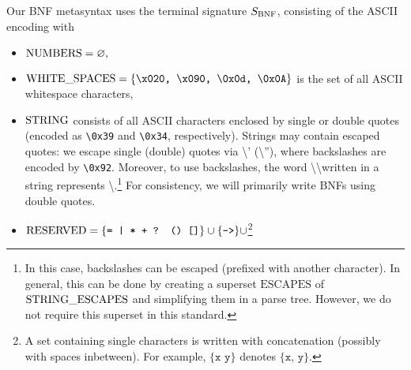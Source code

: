 


Our BNF metasyntax uses the terminal signature $S_{\mathrm{BNF}}$, consisting of the ASCII encoding with
\begin{itemize}
  \item $\mathrm{NUMBERS} = \varnothing,$
  \item $\mathrm{WHITE\_SPACES} = \{\texttt{\textbackslash x020, \textbackslash x090, \textbackslash 0x0d, \textbackslash 0x0A}\} $ is the set of all ASCII whitespace characters,
  \item $\mathrm{STRING}$ consists of all ASCII characters enclosed by single or double quotes (encoded as \texttt{\textbackslash 0x39} and \texttt{\textbackslash 0x34}, respectively). Strings may contain escaped quotes: we escape single (double) quotes via \textbackslash' (\textbackslash''), where backslashes are encoded by \texttt{\textbackslash 0x92}. Moreover, to use backslashes, the word \textbackslash\textbackslash  written in a string represents \textbackslash.\footnote{In this case, backslashes can be escaped (prefixed with another character). In general, this can be done by creating a superset $\mathrm{ESCAPES}$ of $\mathrm{STRING\_ESCAPES}$ and simplifying them in a parse tree. However, we do not require this superset in this standard.} For consistency, we will primarily write BNFs using double quotes.
  \item $\mathrm{RESERVED} = \{\texttt{= | * + ? () []}\} \cup \{\texttt{->}\} \cup $\footnote{A set containing single characters is written with concatenation (possibly with spaces inbetween). For example, $\{\texttt{x y}\}$ denotes $\{\texttt{x, y}\}.$}
\end{itemize}



